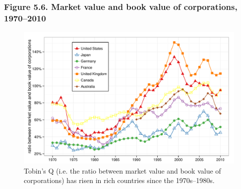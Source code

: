 \documentclass[t]{beamer}\usepackage[]{graphicx}\usepackage[]{color}
\newenvironment{knitrout}{}{} %
\begin{document}
\begin{frame}[label=Figure_5_6]
\frametitle{Figure 5.6. Market value and book value of corporations, 1970--2010}
\begin{figure}[t]
\begin{minipage}[b]{\textwidth}
\centering
\begin{knitrout}\footnotesize
{}\color{fgcolor}

{\centering \includegraphics[width=1\linewidth]{figures/color/Figure_5_6} 

}



\end{knitrout}
\caption{Tobin's Q (i.e. the ratio between market value and book value of corporations) has risen in rich countries since the 1970s--1980s.}
\end{minipage}
\end{figure}
\end{frame}
\end{document}
